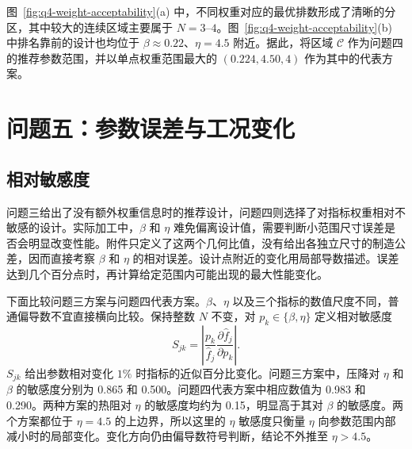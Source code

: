 \documentclass[withoutpreface,bwprint]{cumcmthesis}
\begin{document}
图~\ref{fig:q4-weight-acceptability}(a) 中，不同权重对应的最优排数形成了清晰的分区，其中较大的连续区域主要属于 $N=3$--$4$。图~\ref{fig:q4-weight-acceptability}(b) 中排名靠前的设计也均位于 $\beta\approx0.22$、$\eta=4.5$ 附近。据此，将区域 $\mathcal C$ 作为问题四的推荐参数范围，并以单点权重范围最大的 $(0.224,4.50,4)$ 作为其中的代表方案。

\section{问题五：参数误差与工况变化}
\subsection{相对敏感度}
问题三给出了没有额外权重信息时的推荐设计，问题四则选择了对指标权重相对不敏感的设计。实际加工中，$\beta$ 和 $\eta$ 难免偏离设计值，需要判断小范围尺寸误差是否会明显改变性能。附件只定义了这两个几何比值，没有给出各独立尺寸的制造公差，因而直接考察 $\beta$ 和 $\eta$ 的相对误差。设计点附近的变化用局部导数描述。误差达到几个百分点时，再计算给定范围内可能出现的最大性能变化。

下面比较问题三方案与问题四代表方案。$\beta$、$\eta$ 以及三个指标的数值尺度不同，普通偏导数不宜直接横向比较。保持整数 $N$ 不变，对 $p_k\in\{\beta,\eta\}$ 定义相对敏感度
\begin{equation}
S_{jk}=\left|\frac{p_k}{\hat f_j}\frac{\partial\hat f_j}{\partial p_k}\right|.
\end{equation}
$S_{jk}$ 给出参数相对变化 $1\%$ 时指标的近似百分比变化。问题三方案中，压降对 $\eta$ 和 $\beta$ 的敏感度分别为 0.865 和 0.500。问题四代表方案中相应数值为 0.983 和 0.290。两种方案的热阻对 $\eta$ 的敏感度均约为 0.15，明显高于其对 $\beta$ 的敏感度。两个方案都位于 $\eta=4.5$ 的上边界，所以这里的 $\eta$ 敏感度只衡量 $\eta$ 向参数范围内部减小时的局部变化。变化方向仍由偏导数符号判断，结论不外推至 $\eta>4.5$。
\end{document}
